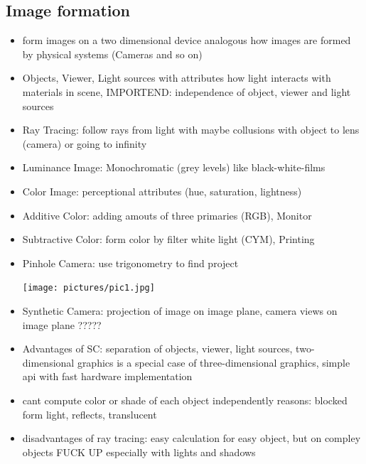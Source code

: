 \documentclass[11pt,a4paper]{article}
\begin{document}
	\subsection{Image formation}
		\begin{itemize}
			\item form images on a two dimensional device analogous how images are formed by physical systems (Cameras and so on)
			\item Objects, Viewer, Light sources with attributes how light interacts with materials in scene, IMPORTEND: independence of object, viewer and light sources
			\item Ray Tracing: follow rays from light with maybe collusions with object to lens (camera) or going to infinity
			\item Luminance Image: Monochromatic (grey levels) like black-white-films
			\item Color Image: perceptional attributes (hue, saturation, lightness)
			\item Additive Color: adding amouts of three primaries (RGB), Monitor
			\item Subtractive Color: form color by filter white light (CYM), Printing
			\item Pinhole Camera: use trigonometry to find project 
			\begin{center}
				\texttt{[image: pictures/pic1.jpg]}
			\end{center}
			\item Synthetic Camera: projection of image on image plane, camera views on image plane ?????
			\item Advantages of SC: separation of objects, viewer, light sources, two-dimensional graphics is a special case of three-dimensional graphics, simple api with fast hardware implementation
			\item cant compute color or shade of each object independently reasons: blocked form light, reflects, translucent
			\item disadvantages of ray tracing: easy calculation for easy object, but on compley objects FUCK UP especially with lights and shadows
		\end{itemize}
\end{document}
